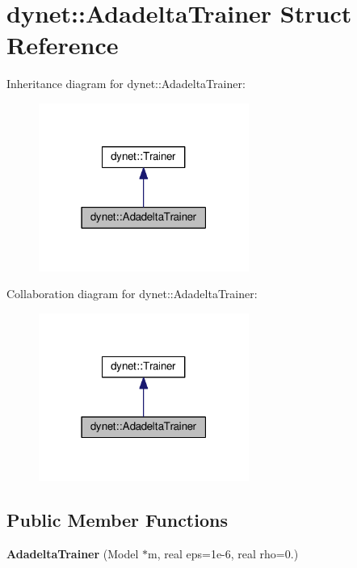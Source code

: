 \hypertarget{structdynet_1_1AdadeltaTrainer}{}\section{dynet\+:\+:Adadelta\+Trainer Struct Reference}
\label{structdynet_1_1AdadeltaTrainer}


Inheritance diagram for dynet\+:\+:Adadelta\+Trainer\+:\nopagebreak
\begin{figure}[H]
\begin{center}
\leavevmode
\includegraphics[width=195pt]{structdynet_1_1AdadeltaTrainer__inherit__graph}
\end{center}
\end{figure}


Collaboration diagram for dynet\+:\+:Adadelta\+Trainer\+:\nopagebreak
\begin{figure}[H]
\begin{center}
\leavevmode
\includegraphics[width=195pt]{structdynet_1_1AdadeltaTrainer__coll__graph}
\end{center}
\end{figure}
\subsection*{Public Member Functions}
\begin{DoxyCompactItemize}
\item 
\hypertarget{structdynet_1_1AdadeltaTrainer_aaed979b129d3a4642321b8d414efea0c}{}{\bfseries Adadelta\+Trainer} (Model $\ast$m, real eps=1e-\/6, real rho=0.)\label{structdynet_1_1AdadeltaTrainer_aaed979b129d3a4642321b8d414efea0c}

\end{DoxyCompactItemize}
